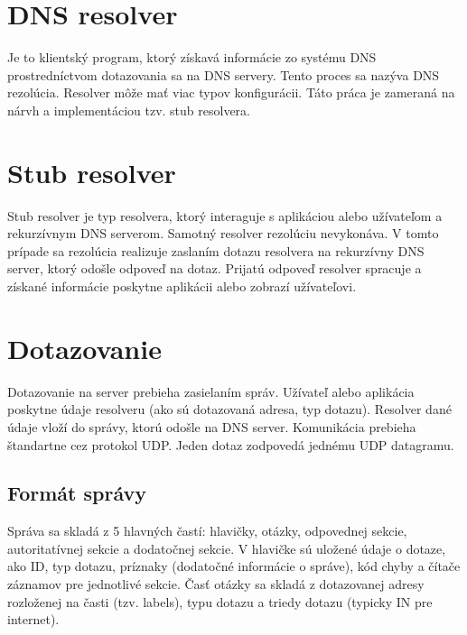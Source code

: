 \section{DNS resolver}
\label{DNS resolver}
Je to klientský program, ktorý získavá informácie zo systému DNS prostredníctvom dotazovania sa na DNS servery. Tento proces sa nazýva DNS rezolúcia.
Resolver môže mať viac typov konfigurácii. 
Táto práca je zameraná na nárvh a implementáciou tzv. stub resolvera.



\section{Stub resolver}
\label{Stub resolver}
Stub resolver je typ resolvera, ktorý interaguje s aplikáciou alebo užívateľom a rekurzívnym DNS serverom. Samotný resolver rezolúciu nevykonáva.
V tomto prípade sa rezolúcia realizuje zaslaním dotazu resolvera na rekurzívny DNS server, ktorý odošle odpoveď na dotaz.
Prijatú odpoveď resolver spracuje a získané informácie poskytne aplikácii alebo zobrazí užívateľovi.

\section{Dotazovanie}
\label{Dotazovanie}

Dotazovanie na server prebieha zasielaním správ. Užívateľ alebo aplikácia poskytne údaje resolveru (ako sú dotazovaná adresa, typ dotazu).
Resolver dané údaje vloží do správy, ktorú odošle na DNS server. Komunikácia prebieha štandartne cez protokol UDP. Jeden dotaz zodpovedá jednému UDP datagramu.

\subsection{Formát správy}
\label{Formát správy}

Správa sa skladá z 5 hlavných častí: hlavičky, otázky, odpovednej sekcie, autoritatívnej sekcie a dodatočnej sekcie. 
V hlavičke sú uložené údaje o dotaze, ako ID, typ dotazu, príznaky (dodatočné informácie o správe), kód chyby a čítače záznamov pre jednotlivé sekcie.
Časť otázky sa skladá z dotazovanej adresy rozloženej na časti (tzv. labels), typu dotazu a triedy dotazu (typicky IN pre internet). 

\newpage

